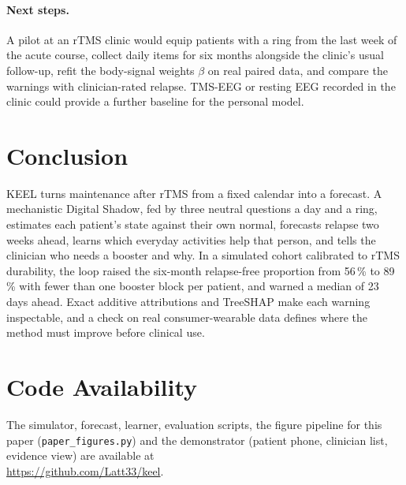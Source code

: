 \documentclass[11pt,a4paper]{article}
\begin{document}
\paragraph{Next steps.} A pilot at an rTMS clinic would equip patients with a ring from the last week of the acute course, collect daily items for six months alongside the clinic's usual follow-up, refit the body-signal weights $\beta$ on real paired data, and compare the warnings with clinician-rated relapse. TMS-EEG or resting EEG recorded in the clinic could provide a further baseline for the personal model.

\section{Conclusion}

KEEL turns maintenance after rTMS from a fixed calendar into a forecast. A mechanistic Digital Shadow, fed by three neutral questions a day and a ring, estimates each patient's state against their own normal, forecasts relapse two weeks ahead, learns which everyday activities help that person, and tells the clinician who needs a booster and why. In a simulated cohort calibrated to rTMS durability, the loop raised the six-month relapse-free proportion from 56\,\% to 89\,\% with fewer than one booster block per patient, and warned a median of 23 days ahead. Exact additive attributions and TreeSHAP make each warning inspectable, and a check on real consumer-wearable data defines where the method must improve before clinical use.

\section*{Code Availability}

The simulator, forecast, learner, evaluation scripts, the figure pipeline for this paper (\texttt{paper\_figures.py}) and the demonstrator (patient phone, clinician list, evidence view) are available at\\ \url{https://github.com/Latt33/keel}.
\end{document}
